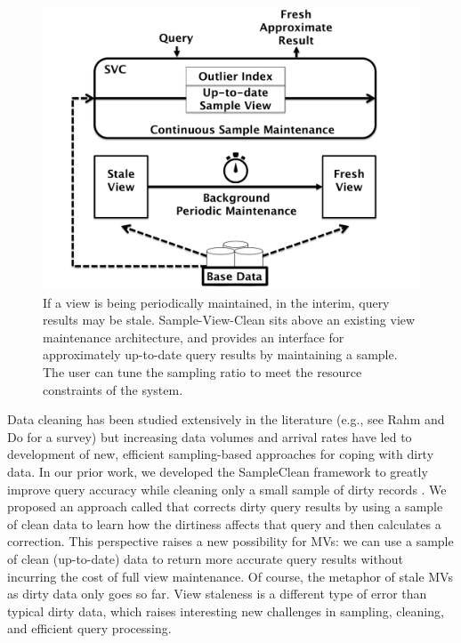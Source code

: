 \begin{figure}[t] \vspace{-2em}
\centering
 \includegraphics[scale=0.24]{figs/sys-arch.pdf} \vspace{-.25em}
 \caption{If a view is being periodically maintained, in the interim, query results may be stale. Sample-View-Clean sits above an existing view maintenance architecture, and provides an interface for approximately up-to-date query results by maintaining a sample. The user can tune the sampling ratio to meet the resource constraints of the system.\label{sys-arch}}\vspace{-1.75em}
\end{figure}

Data cleaning has been studied extensively in the literature (e.g., see Rahm and Do for a survey\cite{rahm2000data}) but increasing data volumes and arrival rates have led to development of new, efficient sampling-based approaches for coping with dirty data.   
In our prior work, we developed the SampleClean framework to greatly improve query accuracy while cleaning only a small sample of dirty records \cite{wang1999sample}.  
We proposed an approach called \nsc that corrects dirty query results by using a sample of clean data to learn how the dirtiness affects that query and then calculates a correction.  
This perspective raises a new possibility for MVs: we can use a sample of clean (up-to-date) data to return more accurate query results without incurring the cost of full view maintenance.
Of course, the metaphor of stale MVs as dirty data only goes so far. 
View staleness is a different type of error than typical dirty data, which raises interesting new challenges in sampling, cleaning, and efficient query processing.

